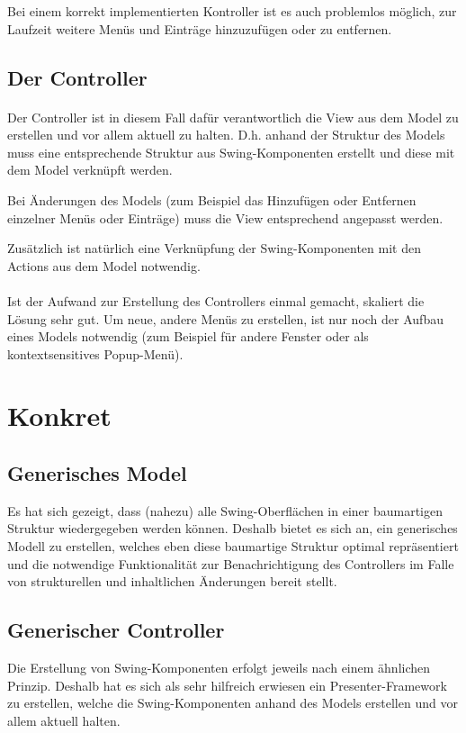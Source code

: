 \documentclass[oneside,a4paper]{scrartcl}
\begin{document}
Bei einem korrekt implementierten Kontroller ist es auch problemlos möglich, zur Laufzeit weitere Menüs und Einträge
hinzuzufügen oder zu entfernen.

\subsection{Der Controller}
\paragraph{}
Der Controller ist in diesem Fall dafür verantwortlich die View aus dem Model zu erstellen und vor allem aktuell
zu halten. D.h. anhand der Struktur des Models muss eine entsprechende Struktur aus Swing-Komponenten erstellt und
diese mit dem Model verknüpft werden.

Bei Änderungen des Models (zum Beispiel das Hinzufügen oder Entfernen einzelner Menüs oder Einträge) muss die View
entsprechend angepasst werden.

Zusätzlich ist natürlich eine Verknüpfung der Swing-Komponenten mit den Actions aus dem Model notwendig.

\paragraph{}
Ist der Aufwand zur Erstellung des Controllers einmal gemacht, skaliert die Lösung sehr gut. Um neue, andere Menüs zu erstellen,
ist nur noch der Aufbau eines Models notwendig (zum Beispiel für andere Fenster oder als kontextsensitives Popup-Menü).




\section{Konkret}

\subsection{Generisches Model}
Es hat sich gezeigt, dass (nahezu) alle Swing-Oberflächen in einer baumartigen Struktur wiedergegeben werden können.
Deshalb bietet es sich an, ein generisches Modell zu erstellen, welches eben diese baumartige Struktur
optimal repräsentiert und die notwendige Funktionalität zur Benachrichtigung des Controllers im Falle von
strukturellen und inhaltlichen Änderungen bereit stellt.

\subsection{Generischer Controller}
Die Erstellung von Swing-Komponenten erfolgt jeweils nach einem ähnlichen Prinzip. Deshalb hat es sich als sehr
hilfreich erwiesen ein Presenter-Framework zu erstellen, welche die Swing-Komponenten anhand des Models erstellen
und vor allem aktuell halten.
\end{document}
